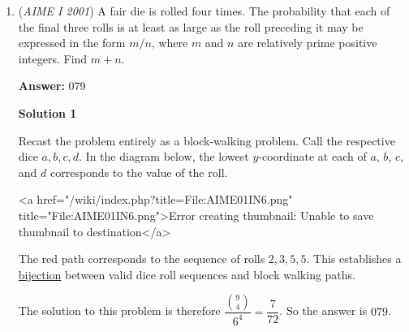 \begin{enumerate}
 This can be rewritten as $\sqrt{\frac{256\cdot3}{169}}=\sqrt{\frac{768}{169}}$. 

 $768+169=\boxed{937}$.

 



\textbf{Solution 7}

Consider the transformation $(x,y)$ to $(x/2, y).$ This sends the ellipse to the unit circle. If we let $n$ be one-fourth of the side length of the triangle, the equilateral triangle is sent to an isosceles triangle with side lengths $2n, n\sqrt{13}, n\sqrt{13}.$ Let the triangle be $ABC$ such that $AB=AC.$ Let the foot of the altitude from A be $X.$ Then $BX=n,$ and $AX=2n\sqrt{3}.$ Let $C$ be a point such that $AC$ is a diameter of the unit circle. Then $XC=2-2n\sqrt{3}.$ Using power of a point on X,
 \[n^2=2n\sqrt{3}(2-2n\sqrt{3})\]Simplifying gets us to $13n^2=4n\sqrt{3}.$ Then, $n=\dfrac{4\sqrt{3}}{13}$ which means the side length is $\dfrac{16\sqrt{3}}{13}=\sqrt{\dfrac{768}{169}}.$Thus, the answer is $768+169=\boxed{937}.$



	\item (\textit{AIME I 2001}) A fair die is rolled four times. The probability that each of the final three rolls is at least as large as the roll preceding it may be expressed in the form $m/n$, where $m$ and $n$ are relatively prime positive integers. Find $m+n$.


 
 \textbf{Answer: }079



\textbf{Solution 1}

Recast the problem entirely as a block-walking problem.  Call the respective dice $a, b, c, d$.  In the diagram below, the lowest $y$-coordinate at each of $a$, $b$, $c$, and $d$ corresponds to the value of the roll.

 <a href="/wiki/index.php?title=File:AIME01IN6.png" title="File:AIME01IN6.png">Error creating thumbnail: Unable to save thumbnail to destination</a>

 The red path corresponds to the sequence of rolls $2, 3, 5, 5$.  This establishes a \href{https://artofproblemsolving.com/wiki/index.php?title=Bijection}{bijection} between valid dice roll sequences and block walking paths.  

 The solution to this problem is therefore $\dfrac{\binom{9}{4}}{6^4} = {\dfrac{7}{72}}$. So the answer is $\boxed{079}$.

 




\end{enumerate}
